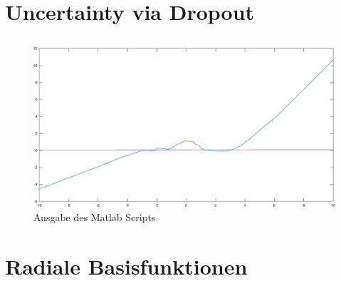 \documentclass[DIN, pagenumber=false, fontsize=11pt, parskip=half]{scrartcl}
\begin{document}
    \section{Uncertainty via Dropout}
    \subsection{}
    
    \subsection{}
    
    \subsection{}
    
    
    \subsection{}
    

    \subsection{}
    \begin{figure}[H]
        \centering
        \includegraphics[width=\textwidth]{b10a02.eps}
        \caption{Ausgabe des Matlab Scripts}
    \end{figure}

    \section{Radiale Basisfunktionen}
\end{document}
